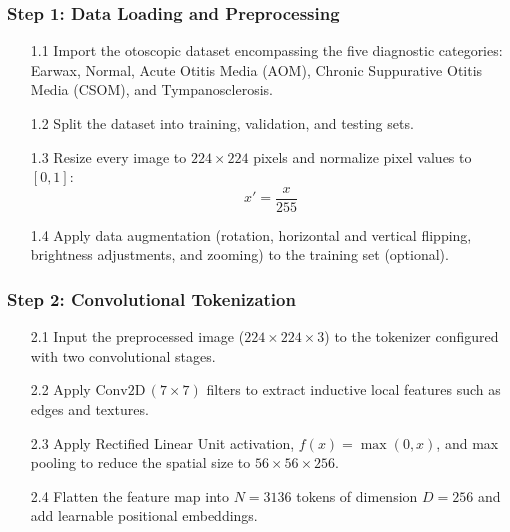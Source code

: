 \documentclass[12pt,a4paper]{report}
\renewcommand{\textbf}[1]{#1}
\begin{document}
\subsubsection*{Step 1: Data Loading and Preprocessing}
\begin{enumerate}
  \item[\textbf{1.1}] Import the otoscopic dataset encompassing the five diagnostic categories: Earwax, Normal, Acute Otitis Media (AOM), Chronic Suppurative Otitis Media (CSOM), and Tympanosclerosis.
  \item[\textbf{1.2}] Split the dataset into training, validation, and testing sets.
  \item[\textbf{1.3}] Resize every image to $224 \times 224$ pixels and normalize pixel values to $[0, 1]$:
    \begin{equation}
      x' = \frac{x}{255}
    \end{equation}
  \item[\textbf{1.4}] Apply data augmentation (rotation, horizontal and vertical flipping, brightness adjustments, and zooming) to the training set (optional).
\end{enumerate}

\subsubsection*{Step 2: Convolutional Tokenization}
\begin{enumerate}
  \item[\textbf{2.1}] Input the preprocessed image ($224 \times 224 \times 3$) to the tokenizer configured with two convolutional stages.
  \item[\textbf{2.2}] Apply $\text{Conv2D}\,(7 \times 7)$ filters to extract inductive local features such as edges and textures.
  \item[\textbf{2.3}] Apply Rectified Linear Unit activation, $f(x) = \max(0, x)$, and max pooling to reduce the spatial size to $56 \times 56 \times 256$.
  \item[\textbf{2.4}] Flatten the feature map into $N = 3136$ tokens of dimension $D = 256$ and add learnable positional embeddings.
\end{enumerate}
\end{document}

